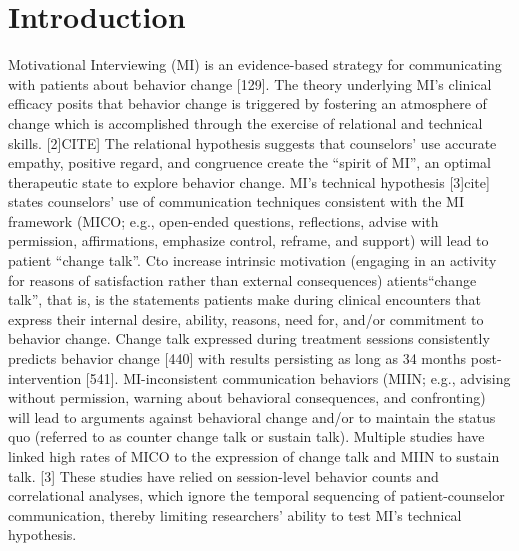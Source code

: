 \section{Introduction}
\label{intro}
Motivational Interviewing (MI) is an evidence-based strategy for communicating with patients about behavior change [129]. The theory underlying MI’s clinical efficacy posits that behavior change is triggered by fostering an atmosphere of change which is accomplished through the exercise of relational and technical skills. [2]CITE] The relational hypothesis suggests that counselors’ use accurate empathy, positive regard, and congruence create the “spirit of MI”, an optimal therapeutic state to explore behavior change. MI’s technical hypothesis [3]cite] states counselors’ use of communication techniques consistent with the MI framework (MICO; e.g., open-ended questions, reflections, advise with permission, affirmations, emphasize control, reframe, and support) will lead to patient “change talk”. Cto increase intrinsic motivation (engaging in an activity for reasons of satisfaction rather than external consequences) atients“change talk”, that is, is the  statements patients make during clinical encounters that express their internal desire, ability, reasons, need for, and/or commitment to behavior change. Change talk expressed during treatment sessions consistently predicts behavior change [440] with results persisting as long as 34 months post-intervention [541]. MI-inconsistent communication behaviors (MIIN; e.g., advising without permission, warning about behavioral consequences, and confronting) will lead to arguments against behavioral change and/or to maintain the status quo (referred to as counter change talk or sustain talk). Multiple studies have linked high rates of MICO to the expression of change talk and MIIN to sustain talk. [3] These studies have relied on session-level behavior counts and correlational analyses, which ignore the temporal sequencing of patient-counselor communication, thereby limiting researchers’ ability to test MI’s technical hypothesis. 

